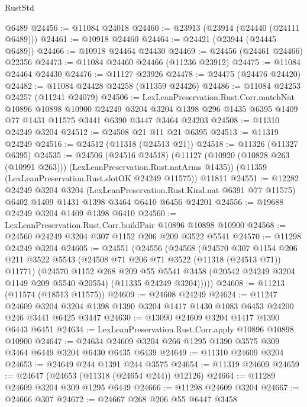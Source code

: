 \begin{lexlean}{RustStd}
\begin{coremodule}
{{{{{{{{{{{{{{{{{{{    @6489
@24456 := @11084 @24018
@24460 := @23913 (@23914 (@24440 (@24111 @6489)))
@24461 := @10918 @24460
@24464 := @24421 (@23944 (@24445 @6489))
@24466 := @10918 @24464 @24430
@24469 := @24456 (@24461 @24466) @22356
@24473 := @11084 @24460 @24466 (@11236 @23912)
@24475 := @11084 @24464 @24430
@24476 := @11127 @23926
@24478 := @24475 (@24476 @24420)
@24482 := @11084 @24428 @24258 (@11359 @24426)
@24486 := @11084 @24253 @24257 (@11241 @24079)
@24506 := LexLeanPreservation.Rust.Corr.matchNat
    @10896
    @10898
    @10900
    @24249
    @3204
    @3204
    @1398
    @296
    @1435
    @6395
    @1409
    @77
    @1431
    @11575
    @3441
    @6390
    @3447
    @3464
    @24203
@24508 := @11310 @24249 @3204
@24512 := @24508 @21 @11 @21 @6395
@24513 := @11319 @24249
@24516 := @24512 (@11318 (@24513 @21))
@24518 := @11326 (@11327 @6395)
@24535 := @24506
    (@24516 @24518)
    (@11127 (@10920 (@10828 @263 (@10991 @263))) (LexLeanPreservation.Rust.natArms @1435))
    (@11359 (LexLeanPreservation.Rust.slotOK @24249 @11575))
    @11811
@24551 := @12282
    @24249
    @3204
    @3204
    (LexLeanPreservation.Rust.Kind.nat @6391 @77 @11575)
    @6402
    @1409
    @1431
    @1398
    @3464
    @6410
    @6456
    @24201
@24556 := @19688 @24249 @3204 @1409 @1398 @6410
@24560 := LexLeanPreservation.Rust.Corr.buildPair @10896 @10898 @10900
@24568 := @24560 @24249 @3204 @307 @1152 @206 @209 @3522 @5541
@24570 := @11298 @24249 @3204
@24605 := @24551
    (@24556
      (@24568
        (@24570
          @307
          @1154
          @206
          @211
          @3522
          @5543
          (@24508 @71 @206 @71 @3522 (@11318 (@24513 @71)) @11771)
          (@24570
            @1152
            @268
            @209
            @55
            @5541
            @3458
            (@20542 @24249 @3204 @1149 @209 @5540 @20554)
            (@11335 @24249 @3204)))))
@24608 := @11213 (@11574 (@18513 @11575))
@24609 := @24608 @24249
@24624 := @11247
    @24609
    @3204
    @3204
    @1398
    @1390
    @3204
    @1417
    @1430
    @1083
    @6453
    @24200
    @246
    @3441
    @6425
    @3447
@24630 := @13090 @24609 @3204 @1417 @1390 @6443 @6451
@24634 := LexLeanPreservation.Rust.Corr.apply @10896 @10898 @10900
@24647 := @24634 @24609 @3204 @266 @1295 @1390 @3575 @309 @3464 @6449 @3204 @6430 @6435 @6439
@24649 := @11310 @24609 @3204
@24653 := @24649 @244 @1391 @244 @3575
@24654 := @11319 @24609
@24659 := @24647 (@24653 (@11318 (@24654 @244)) @12126)
@24664 := @11289 @24609 @3204 @309 @1295 @6449
@24666 := @11298 @24609 @3204
@24667 := @24666 @307
@24672 := @24667 @268 @206 @55 @6447 @3458
}}}}}}}}}}}}}}}}}}}
\end{coremodule}
\end{lexlean}
